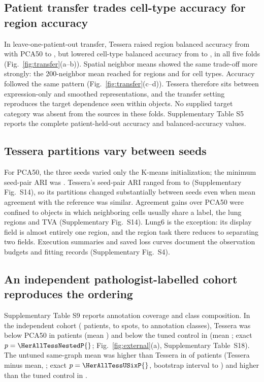 \documentclass[11pt]{article}
\newcommand{\panelref}[2]{Fig.~\ref{#1}(#2)}
\begin{document}
\subsection{Patient transfer trades cell-type accuracy for region accuracy}
In leave-one-patient-out transfer, Tessera raised region balanced accuracy from \TransferRegionPca{} with PCA50 to \TransferRegionFull{}, but lowered cell-type balanced accuracy from \TransferCellPca{} to \TransferCellFull{}, in all five folds (\panelref{fig:transfer}{a--b}). Spatial neighbor means showed the same trade-off more strongly: the 200-neighbor mean reached \TransferRegionMeanTwoHundred{} for regions and \TransferCellMeanTwoHundred{} for cell types. Accuracy followed the same pattern (\panelref{fig:transfer}{c--d}). Tessera therefore sits between expression-only and smoothed representations, and the transfer setting reproduces the target dependence seen within objects. No supplied target category was absent from the sources in these folds. Supplementary Table S5 reports the complete patient-held-out accuracy and balanced-accuracy values.





\subsection{Tessera partitions vary between seeds}
For PCA50, the three seeds varied only the K-means initialization; the minimum seed-pair ARI was \StabilityPcaMin{}. Tessera's seed-pair ARI ranged from \StabilityTesseraMin{} to \StabilityTesseraMax{} (Supplementary Fig.~S14), so its partitions changed substantially between seeds even when mean agreement with the reference was similar. Agreement gains over PCA50 were confined to objects in which neighboring cells usually share a label, the lung regions and TVA (Supplementary Fig.~S14). Lung6 is the exception: its display field is almost entirely one region, and the region task there reduces to separating two fields. Execution summaries and saved loss curves document the observation budgets and fitting records (Supplementary Fig.~S4).

\subsection{An independent pathologist-labelled cohort reproduces the ordering}
Supplementary Table S9 reports annotation coverage and class composition. In the independent cohort (\HerPatients{} patients, \HerSpotsMin{} to \HerSpotsMax{} spots, \HerClassesMin{} to \HerClassesMax{} annotation classes), Tessera was below PCA50 in \HerAllTessPcaNeg{} patients (mean \HerAllTessPcaMean{}) and below the tuned control in \HerAllTessNestedNeg{} (mean \HerAllTessNestedMean{}; exact \(p=\HerAllTessNestedP{}\); \panelref{fig:external}{a}, Supplementary Table~S18). The untuned same-graph mean was higher than Tessera in \HerAllTessUSixNeg{} of \HerPatients{} patients (Tessera minus mean, \HerAllTessUSixMean{}; exact \(p=\HerAllTessUSixP{}\), bootstrap interval \HerAllTessUSixLo{} to \HerAllTessUSixHi{}) and higher than the tuned control in \HerAllUSixNestedPos{}.
\end{document}
